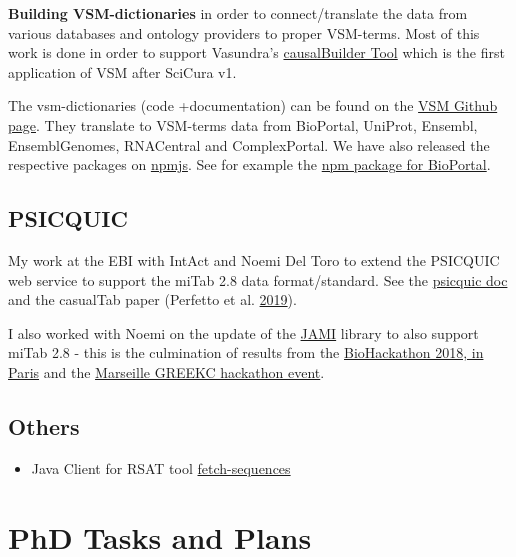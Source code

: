 \documentclass[12pt,]{book}
\providecommand{\tightlist}{%
  \setlength{\itemsep}{0pt}\setlength{\parskip}{0pt}}
\begin{document}
\textbf{Building VSM-dictionaries} in order to
connect/translate the data from various databases and ontology providers to
proper VSM-terms. Most of this work is done in order to support Vasundra's
\href{https://vtoure.github.io/causalBuilder/}{causalBuilder Tool} which is the
first application of VSM after SciCura v1.

The vsm-dictionaries (code +documentation) can be found on the \href{https://github.com/vsmjs}{VSM Github page}. They translate to VSM-terms data from BioPortal, UniProt, Ensembl, EnsemblGenomes, RNACentral and ComplexPortal. We have also released the respective
packages on \href{https://www.npmjs.com/}{npmjs}. See for example the \href{https://www.npmjs.com/package/vsm-dictionary-bioportal}{npm package for
BioPortal}.

\hypertarget{psicquic}{%
\section{PSICQUIC}\label{psicquic}}

My work at the EBI with IntAct and Noemi Del Toro to extend the PSICQUIC web service to support the
miTab 2.8 data format/standard. See the \href{http://psicquic.github.io/MITAB28Format.html}{psicquic doc} and the casualTab paper (Perfetto et al. \protect\hyperlink{ref-Perfetto2019}{2019}).

I also worked with Noemi on the update of the \href{https://github.com/MICommunity/psi-jami}{JAMI}
library to also support miTab 2.8 - this is the culmination of results from the
\href{https://2018.biohackathon-europe.org/}{BioHackathon 2018, in Paris} and the
\href{https://github.com/GREEKC/hackathon-marseille/tree/master/project_descriptions/causal_psicquic}{Marseille GREEKC hackathon event}.

\hypertarget{others}{%
\section{Others}\label{others}}

\begin{itemize}
\tightlist
\item
  Java Client for RSAT tool \href{https://github.com/bblodfon/rsat-rest-java-clients}{fetch-sequences}
\end{itemize}

\hypertarget{plans}{%
\chapter{PhD Tasks and Plans}\label{plans}}
\end{document}
